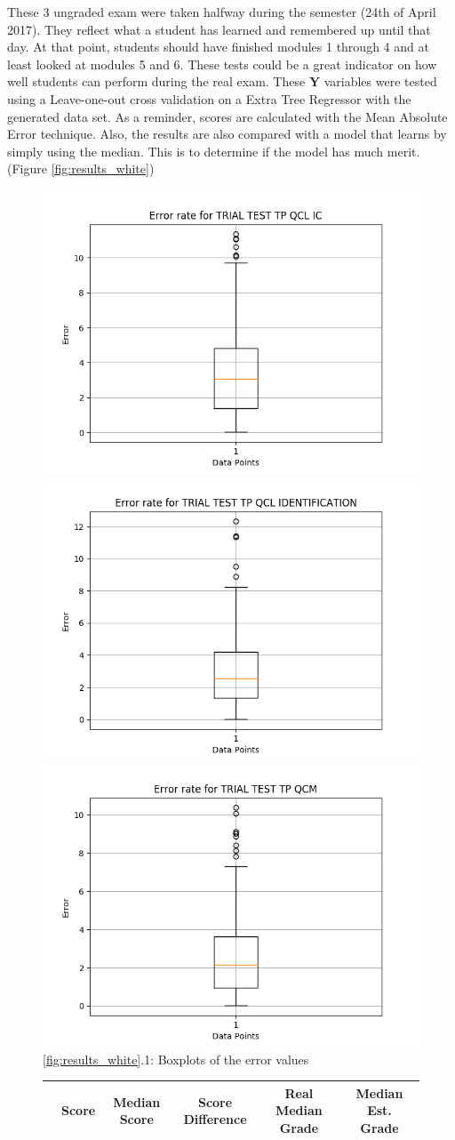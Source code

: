 \documentclass[a4paper,11pt]{report}
\numberwithin{figure}{section} %
\begin{document}
    These 3 ungraded exam were taken halfway during the semester (24th of April 2017). They reflect what a student has learned and remembered up until that day. At that point, students should have finished modules 1 through 4 and at least looked at modules 5 and 6. These tests could be a great indicator on how well students can perform during the real exam. These \textbf{Y} variables were tested using a Leave-one-out cross validation on a Extra Tree Regressor with the generated data set. As a reminder, scores are calculated with the Mean Absolute Error technique. Also, the results are also compared with a model that learns by simply using the median. This is to determine if the model has much merit. (Figure \ref{fig:results_white})
    \begin{figure}[H]
      \centering
  	  \includegraphics[width=.3\linewidth]{cv_boxplot_TRIAL_TEST_TP_QCL_IC_2018-04-27_14_35_12.png}
  	  \includegraphics[width=.3\linewidth]{cv_boxplot_TRIAL_TEST_TP_QCL_IDENTIFICATION_2018-04-27_14_31_56.png}
      \includegraphics[width=.3\linewidth]{cv_boxplot_TRIAL_TEST_TP_QCM_2018-04-27_17_16_59.png}
      \\
      \ref{fig:results_white}.1: Boxplots of the error values
      \\
      \vspace{0.5cm}
      \begin{tabular}{| l | c | c | c | c | c |}
      \hline
      & \tiny{Score} & \tiny{Median Score} & \tiny{Score Difference} & \tiny{Real Median Grade} & \tiny{Median Est. Grade}\\ \hline

\end{tabular}
\end{figure}
\end{document}
